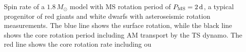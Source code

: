  \label{fig:MRI1.8rot} Spin rate of a $1.8 \, M_\odot$ model with MS rotation period of $P_{\rm MS} = 2 \, {\rm d}$, a typical progenitor of red giants and white dwarfs with asteroseismic rotation measurements. The blue line shows the surface rotation, while the black line shows the core rotation period including AM transport by the TS dynamo. The red line shows the core rotation rate including ou